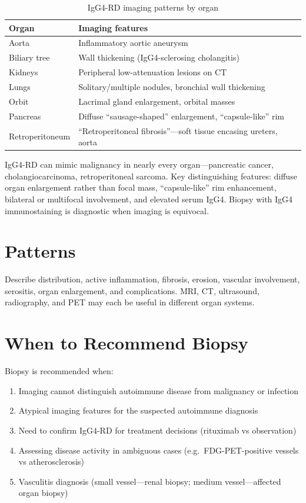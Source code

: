 \begin{table}[h]
\centering
\caption{IgG4-RD imaging patterns by organ}
\begin{tabular}{|p{}|p{}|}
\hline
\textbf{Organ} & \textbf{Imaging features} \\
\hline
Aorta & Inflammatory aortic aneurysm \\
Biliary tree & Wall thickening (IgG4-sclerosing cholangitis) \\
Kidneys & Peripheral low-attenuation lesions on CT \\
Lungs & Solitary/multiple nodules, bronchial wall thickening \\
Orbit & Lacrimal gland enlargement, orbital masses \\
Pancreas & Diffuse ``sausage-shaped'' enlargement, ``capsule-like'' rim \\
Retroperitoneum & ``Retroperitoneal fibrosis''---soft tissue encasing ureters, aorta \\
\hline
\end{tabular}
\end{table}

\begin{pearlbox}
IgG4-RD can mimic malignancy in nearly every organ---pancreatic cancer, cholangiocarcinoma, retroperitoneal sarcoma. Key distinguishing features: diffuse organ enlargement rather than focal mass, ``capsule-like'' rim enhancement, bilateral or multifocal involvement, and elevated serum IgG4. Biopsy with IgG4 immunostaining is diagnostic when imaging is equivocal.
\end{pearlbox}

\section{Patterns}
Describe distribution, active inflammation, fibrosis, erosion, vascular involvement, serositis, organ enlargement, and complications. MRI, CT, ultrasound, radiography, and PET may each be useful in different organ systems.

\section{When to Recommend Biopsy}
Biopsy is recommended when:
\begin{enumerate}
  \item Imaging cannot distinguish autoimmune disease from malignancy or infection
  \item Atypical imaging features for the suspected autoimmune diagnosis
  \item Need to confirm IgG4-RD for treatment decisions (rituximab vs observation)
  \item Assessing disease activity in ambiguous cases (e.g.\ FDG-PET-positive vessels vs atherosclerosis)
  \item Vasculitis diagnosis (small vessel---renal biopsy; medium vessel---affected organ biopsy)
\end{enumerate}


